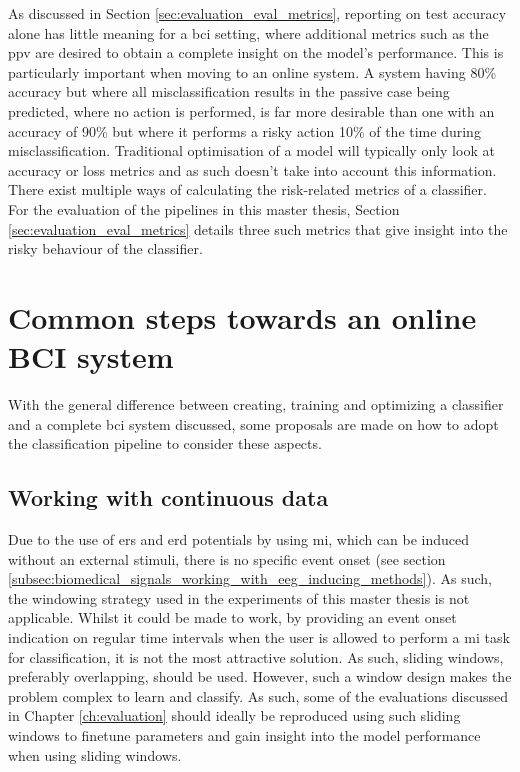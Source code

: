 As discussed in Section \ref{sec:evaluation_eval_metrics}, reporting on test accuracy alone has little meaning for a \gls{bci} setting, where additional metrics such as the \gls{ppv} are desired to obtain a complete insight on the model's performance.
This is particularly important when moving to an online system.
A system having 80\% accuracy but where all misclassification results in the passive case being predicted, where no action is performed, is far more desirable than one with an accuracy of 90\% but where it performs a risky action 10\% of the time during misclassification.
Traditional optimisation of a model will typically only look at accuracy or loss metrics and as such doesn't take into account this information.
There exist multiple ways of calculating the risk-related metrics of a classifier.
For the evaluation of the pipelines in this master thesis, Section \ref{sec:evaluation_eval_metrics} details three such metrics that give insight into the risky behaviour of the classifier.

\section{Common steps towards an online BCI system}
\label{sec:online_bci_system_different_common_steps}

With the general difference between creating, training and optimizing a classifier and a complete \gls{bci} system discussed, some proposals are made on how to adopt the classification pipeline to consider these aspects.


\subsection{Working with continuous data}
\label{subsec:online_bci_system_different_common_steps_sliding_window} 

Due to the use of \gls{ers} and \gls{erd} potentials by using \gls{mi}, which can be induced without an external stimuli, there is no specific event onset (see section \ref{subsec:biomedical_signals_working_with_eeg_inducing_methods}).
As such, the windowing strategy used in the experiments of this master thesis is not applicable.
Whilst it could be made to work, by providing an event onset indication on regular time intervals when the user is allowed to perform a \gls{mi} task for classification, it is not the most attractive solution.
As such, sliding windows, preferably overlapping, should be used.
However, such a window design makes the problem complex to learn and classify.
As such, some of the evaluations discussed in Chapter \ref{ch:evaluation} should ideally be reproduced using such sliding windows to finetune parameters and gain insight into the model performance when using sliding windows.

